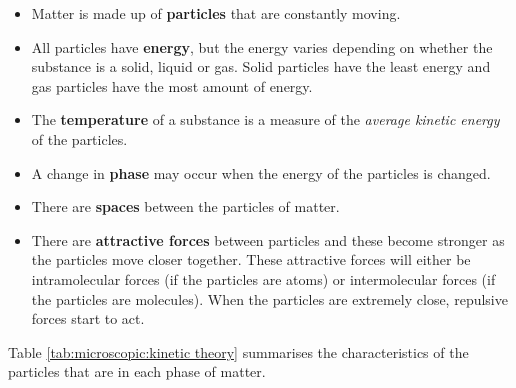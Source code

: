 \begin{itemize} 
  \item{Matter is made up of \textbf{particles} that are constantly moving. }
\item{All particles have \textbf{energy}, but the energy varies depending on whether the substance is a solid, liquid or gas. Solid particles have the least energy and gas particles have the most amount of energy.}
\item{The \textbf{temperature} of a substance is a measure of the \textit{average kinetic energy} of the particles.}
  \item{A change in \textbf{phase} may occur when the energy of the particles is changed.}
  \item{There are \textbf{spaces} between the particles of matter.}
  \item{There are \textbf{attractive forces} between particles and these become stronger as the particles move closer together. These attractive forces will either be intramolecular forces (if the particles are atoms) or intermolecular forces (if the particles are molecules). When the particles are extremely close, repulsive forces start to act.}
  \end{itemize}

Table \ref{tab:microscopic:kinetic theory} summarises the characteristics of the particles that are in each phase of matter.

